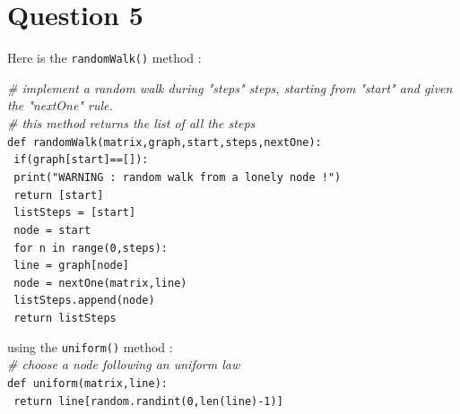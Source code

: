\documentclass[a4paper]{report}
\begin{document}
\section*{Question 5}
Here is the \texttt{randomWalk()} method :

\medbreak
\noindent     \textit{\# implement a random walk during "steps" steps, starting from "start" and given the "nextOne" rule.}\\
\noindent     \textit{\# this method returns the list of all the steps}\\
\noindent     \texttt{def randomWalk(matrix,graph,start,steps,nextOne):}\\
\hspace*{1cm} \texttt{	if(graph[start]==[]):}\\
\hspace*{2cm} \texttt{		print("WARNING : random walk from a lonely node !")}\\
\hspace*{2cm} \texttt{		return [start]}\\
\hspace*{1cm} \texttt{	listSteps = [start]}\\
\hspace*{1cm} \texttt{	node = start}\\
\hspace*{1cm} \texttt{	for n in range(0,steps):}\\
\hspace*{2cm} \texttt{		line = graph[node]}\\
\hspace*{2cm} \texttt{		node = nextOne(matrix,line)}\\
\hspace*{2cm} \texttt{		listSteps.append(node)}\\
\hspace*{1cm} \texttt{	return listSteps}\\
\medbreak

using the \texttt{uniform()} method : \\

\medbreak
\noindent     \textit{\# choose a node following an uniform law}\\
\noindent     \texttt{def uniform(matrix,line):}\\
\hspace*{1cm} \texttt{	return line[random.randint(0,len(line)-1)]}\\
\medbreak
\end{document}
